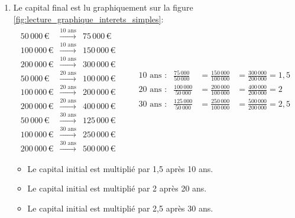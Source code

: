 \documentclass{article}
\begin{document}
\begin{enumerate}[label=\textbf{R1.\arabic*}]
    \item Le capital final est lu graphiquement sur la figure \ref{fig:lecture_graphique_interets_simples}:
          \begin{align*}
              \begin{array}{rcl}
              50\,000\,\text{€}  & \xrightarrow{\text{10 ans}} & 75\,000\,\text{€} \\
              100\,000\,\text{€} & \xrightarrow{\text{10 ans}} & 150\,000\,\text{€} \\
              200\,000\,\text{€} & \xrightarrow{\text{10 ans}} & 300\,000\,\text{€} \\
              50\,000\,\text{€}  & \xrightarrow{\text{20 ans}} & 100\,000\,\text{€} \\
              100\,000\,\text{€} & \xrightarrow{\text{20 ans}} & 200\,000\,\text{€} \\
              200\,000\,\text{€} & \xrightarrow{\text{20 ans}} & 400\,000\,\text{€} \\
              50\,000\,\text{€}  & \xrightarrow{\text{30 ans}} & 125\,000\,\text{€} \\
              100\,000\,\text{€} & \xrightarrow{\text{30 ans}} & 250\,000\,\text{€} \\
              200\,000\,\text{€} & \xrightarrow{\text{30 ans}} & 500\,000\,\text{€}
              \end{array}
              \qquad
              \begin{array}{rrcl}
              10 \text{ ans :} & \displaystyle \frac{75\,000}{50\,000}  & = \displaystyle \frac{150\,000}{100\,000} & = \displaystyle \frac{300\,000}{200\,000} = 1,5 \\[1em]
              20 \text{ ans :} & \displaystyle \frac{100\,000}{50\,000} & = \displaystyle \frac{200\,000}{100\,000} & = \displaystyle \frac{400\,000}{200\,000} = 2   \\[1em]
              30 \text{ ans :} & \displaystyle \frac{125\,000}{50\,000} & = \displaystyle \frac{250\,000}{100\,000} & = \displaystyle \frac{500\,000}{200\,000} = 2,5 
              \end{array}
          \end{align*}
          
          \begin{itemize}
              \item Le capital initial est multiplié par 1,5 après 10 ans.
              \item Le capital initial est multiplié par 2 après 20 ans.
              \item Le capital initial est multiplié par 2,5 après 30 ans.
          \end{itemize}
              

\end{enumerate}
\end{document}
